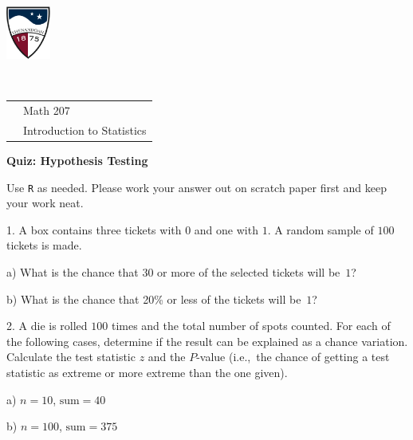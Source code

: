 \documentclass[10pt]{article}
\begin{document}
\pagestyle{empty}
\lstset{language=R, showspaces=false, showstringspaces=false}
\href{http://www.su.edu}{\includegraphics[height=1.75cm]{sulogo.eps}}
\vspace{-1.79cm}

{{\ }\hfill\small
\begin{tabular}{cl}
& Math 207\\
& Introduction to Statistics\\
\end{tabular}
}

\setlength{\baselineskip}{1.05\baselineskip}
\medskip

\begin{center}
\textbf{\large  Quiz:  Hypothesis Testing}
\end{center}
Use \texttt{R} as needed.  Please work your answer out on scratch
paper first and keep your work neat.
\smallskip


\newcommand{\HH}{\hspace{20pt}\hphantom{a) } }

1. A box contains three tickets with $0$ and one with $1$.  
A random sample of $100$ tickets is made.  

\hspace{20pt} a) What is the chance that 30 or more of the selected
tickets will be~$1$?
\vspace{1in}

\hspace{20pt} b) What is the chance that 20\% or less of the tickets will be~$1$?
\vspace{1in}

2. A die is rolled $100$ times and the total number of spots counted.
For each of the following cases, determine if the result can be explained as a chance
variation.  Calculate the test statistic $z$ and the $P$-value
(i.e.,~the chance of getting a test statistic 
  as extreme or more extreme than the one given).

\hspace{20pt} a) $n=10$, $\mbox{sum}=40$
\vspace{1.75in}

\hspace{20pt} b) $n=100$, $\mbox{sum}=375$
\vspace{1.5in}
\end{document}
